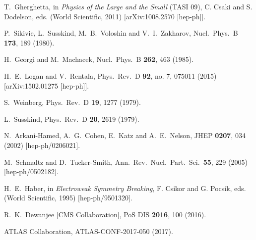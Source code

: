 \documentclass[12pt]{article}
\begin{document}
\begin{thebibliography}{99}
 T.~Gherghetta,
in {\it Physics of the Large and the Small} (TASI 09), C. Csaki and
S. Dodelson, eds. (World Scientific, 2011)
  [arXiv:1008.2570 [hep-ph]].
 
 P.~Sikivie, L.~Susskind, M.~B.~Voloshin and V.~I.~Zakharov,
  Nucl.\ Phys.\ B {\bf 173}, 189 (1980).

 H.~Georgi and M.~Machacek,
  Nucl.\ Phys.\ B {\bf 262}, 463 (1985).

 H.~E.~Logan and V.~Rentala,
  Phys.\ Rev.\ D {\bf 92}, no. 7, 075011 (2015)
  [arXiv:1502.01275 [hep-ph]].

  S.~Weinberg,
  Phys.\ Rev.\ D {\bf 19}, 1277 (1979).

  L.~Susskind,
  Phys.\ Rev.\ D {\bf 20}, 2619 (1979).

 N.~Arkani-Hamed, A.~G.~Cohen, E.~Katz and A.~E.~Nelson,
  JHEP {\bf 0207}, 034 (2002)
  [hep-ph/0206021].


 M.~Schmaltz and D.~Tucker-Smith,
  Ann.\ Rev.\ Nucl.\ Part.\ Sci.\  {\bf 55}, 229 (2005)
  [hep-ph/0502182].

 H.~E.~Haber,
in {\it Electroweak Symmetry Breaking}, F. Csikor and G. Pocsik,
eds. (World Scientific, 1995) 
  [hep-ph/9501320].

 R.~K.~Dewanjee [CMS Collaboration],
  PoS DIS {\bf 2016}, 100 (2016).

 ATLAS Collaboration,
  ATLAS-CONF-2017-050 (2017).


\end{thebibliography}
\end{document}
